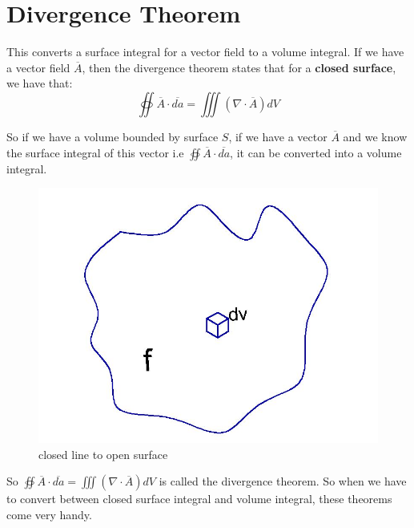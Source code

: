\section{Divergence Theorem}

This converts a surface integral for a vector field to a volume integral. If we have a vector field $\overline{A}$, then the divergence theorem states that for a \textbf{closed surface}, we have that:
\begin{equation}
\oiint \overline{A} \cdot \overline{da} = \iiint (\nabla \cdot \overline{A})dV
\end{equation}

So if we have a volume bounded by surface $S$, if we have a vector $\overline{A}$ and we know the surface integral of this vector i.e $\oiint \overline{A}\cdot\overline{da}$, it can be converted into a volume integral.
\begin{figure}
\centering
\includegraphics[width=0.7\linewidth]{./graphics/fig175}
\caption{closed line to open surface }
\label{fig:page-8}
\end{figure}


So $\oiint \overline{A} \cdot \overline{da} = \iiint (\nabla \cdot \overline{A})dV$ is called the divergence theorem. So when we have to convert between closed surface integral and volume integral, these theorems come very handy.

